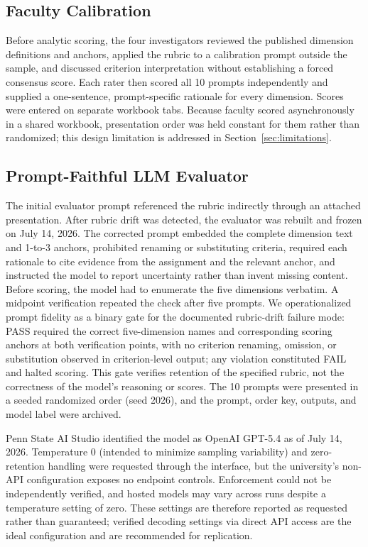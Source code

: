 \documentclass[sigconf]{acmart}
\begin{document}
\subsection{Faculty Calibration}
Before analytic scoring, the four investigators reviewed the published dimension definitions and anchors, applied the rubric to a calibration prompt outside the sample, and discussed criterion interpretation without establishing a forced consensus score. Each rater then scored all 10 prompts independently and supplied a one-sentence, prompt-specific rationale for every dimension. Scores were entered on separate workbook tabs. Because faculty scored asynchronously in a shared workbook, presentation order was held constant for them rather than randomized; this design limitation is addressed in Section~\ref{sec:limitations}.

\subsection{Prompt-Faithful LLM Evaluator}
The initial evaluator prompt referenced the rubric indirectly through an attached presentation. After rubric drift was detected, the evaluator was rebuilt and frozen on July 14, 2026. The corrected prompt embedded the complete dimension text and 1-to-3 anchors, prohibited renaming or substituting criteria, required each rationale to cite evidence from the assignment and the relevant anchor, and instructed the model to report uncertainty rather than invent missing content. Before scoring, the model had to enumerate the five dimensions verbatim. A midpoint verification repeated the check after five prompts. We operationalized prompt fidelity as a binary gate for the documented rubric-drift failure mode: PASS required the correct five-dimension names and corresponding scoring anchors at both verification points, with no criterion renaming, omission, or substitution observed in criterion-level output; any violation constituted FAIL and halted scoring. This gate verifies retention of the specified rubric, not the correctness of the model's reasoning or scores. The 10 prompts were presented in a seeded randomized order (seed 2026), and the prompt, order key, outputs, and model label were archived.

Penn State AI Studio identified the model as OpenAI GPT-5.4 as of July 14, 2026. Temperature 0 (intended to minimize sampling variability) and zero-retention handling were requested through the interface, but the university's non-API configuration exposes no endpoint controls. Enforcement could not be independently verified, and hosted models may vary across runs despite a temperature setting of zero. These settings are therefore reported as requested rather than guaranteed; verified decoding settings via direct API access are the ideal configuration and are recommended for replication.
\end{document}
